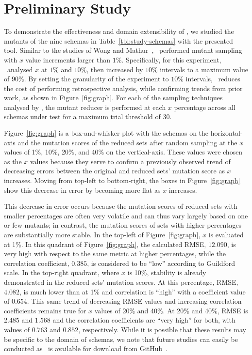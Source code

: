 \section{Preliminary Study}


To demonstrate the effectiveness and domain extensibility of \mrstudyr, we studied the mutants of the nine schemas in
Table~\ref{tbl:study-schemas} with the presented tool. Similar to the studies of Wong and Mathur~\cite{mathur1994empirical},
\mr~performed mutant sampling with $x$ value increments larger than $1\%$. Specifically, for this experiment, \mr~analysed
$x$ at $1\%$ and $10\%$, then increased by $10\%$ intervals to a maximum value of $90\%$. By setting the granularity of the
experiment to $10\%$ intervals, \mr~reduces the cost of performing retrospective analysis, while confirming trends from prior
work, as shown in Figure~\ref{fig:graph}. For each of the sampling techniques analysed by \mr, the mutant reducer is performed
at each $x$ percentage across all schemas under test for a maximum trial threshold of 30.

Figure~\ref{fig:graph} is a box-and-whisker plot with the schemas on the horizontal-axis and the mutation scores of the reduced
sets after random sampling at the $x$ values of 1\%, 10\%, 20\%, and 40\% on the vertical-axis.  These values were chosen as the
$x$ values because they serve to confirm a previously observed trend of decreasing errors between the original and reduced sets'
mutation score as $x$ increases. Moving from top-left to bottom-right, the boxes in Figure~\ref{fig:graph} show this decrease in
error by becoming more flat as $x$ increases.

This decrease in error occurs because the mutation scores of reduced sets with smaller percentages are often very volatile and can
thus vary largely based on one or few mutants; in contrast, the mutation scores of sets with higher percentages are substantially
more stable. In the top-left of Figure~\ref{fig:graph}, $x$ is evaluated at 1\%.  In this quadrant of Figure~\ref{fig:graph}, the
calculated RMSE, $12.090$, is very high with respect to the same metric at higher percentages, while the correlation coefficient,
$0.385$, is considered to be ``low'' according to Guildford scale. In the top-right quadrant, where
$x$ is 10\%, stability is already demonstrated in the reduced sets' mutation scores. At this percentage, RMSE, $4.082$, is much lower
than at 1\% and correlation is ``high'' with a coefficient value of $0.654$. This same trend of decreasing RMSE values and increasing
correlation coefficients remains true for $x$ values of 20\% and 40\%. At 20\% and 40\%, RMSE is $2.485$ and $1.568$ and the correlation
coefficients are ``very high'' for both, with values of $0.763$ and $0.852$, respectively. While it is possible that these results may
be specific to the domain of schemas, we note that future studies can easily be conducted as \mr~is available for download from
GitHub~\cite{tool}.


